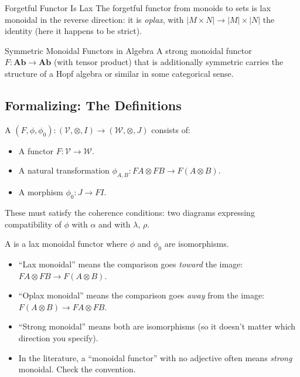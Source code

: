 \begin{example}{Forgetful Functor Is Lax}
The forgetful functor from monoids to sets is lax monoidal in the reverse
direction: it is \emph{oplax}, with $|M \times N| \to |M| \times |N|$ the
identity (here it happens to be strict).
\end{example}

\begin{example}{Symmetric Monoidal Functors in Algebra}
A strong monoidal functor $F : \mathbf{Ab} \to \mathbf{Ab}$ (with tensor
product) that is additionally symmetric carries the structure of a Hopf algebra
or similar in some categorical sense.
\end{example}

\subsection{Formalizing: The Definitions}

\begin{definition}
A  $(F, \phi, \phi_0) : (\mathcal{V}, \otimes, I)
\to (\mathcal{W}, \otimes, J)$ consists of:
\begin{itemize}
  \item A functor $F : \mathcal{V} \to \mathcal{W}$.
  \item A natural transformation $\phi_{A,B} : FA \otimes FB \to F(A \otimes B)$.
  \item A morphism $\phi_0 : J \to FI$.
\end{itemize}
These must satisfy the coherence conditions: two diagrams expressing compatibility
of $\phi$ with $\alpha$ and with $\lambda$, $\rho$.
\end{definition}

\begin{definition}
A  is a lax monoidal functor where $\phi$ and
$\phi_0$ are isomorphisms.
\end{definition}

\begin{howtosay}
\begin{itemize}
  \item ``Lax monoidal'' means the comparison goes \emph{toward} the image:
        $FA \otimes FB \to F(A \otimes B)$.
  \item ``Oplax monoidal'' means the comparison goes \emph{away} from the
        image: $F(A \otimes B) \to FA \otimes FB$.
  \item ``Strong monoidal'' means both are isomorphisms (so it doesn't matter
        which direction you specify).
  \item In the literature, a ``monoidal functor'' with no adjective often means
        \emph{strong} monoidal. Check the convention.
\end{itemize}
\end{howtosay}

